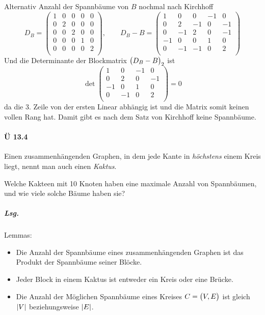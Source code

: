 \documentclass{scrreprt}
\begin{document}
\begin{enumerate}[(a)]
  \newpage
  Alternativ Anzahl der Spannbäume von $B$ nochmal nach Kirchhoff
  \[
    D_B = \begin{pmatrix}
      1 & 0 & 0 & 0 & 0 \\
      0 & 2 & 0 & 0 & 0 \\
      0 & 0 & 2 & 0 & 0 \\
      0 & 0 & 0 & 1 & 0 \\
      0 & 0 & 0 & 0 & 2 \\
    \end{pmatrix}, \qquad
    D_B - B = \begin{pmatrix}
      1  & 0  & 0  & -1 & 0  \\
      0  & 2  & -1 & 0  & -1 \\
      0  & -1 & 2  & 0  & -1 \\
      -1 & 0  & 0  & 1  & 0  \\
      0  & -1 & -1 & 0  & 2  \\
    \end{pmatrix}
  \]
  Und die Determinante der Blockmatrix $\qty\big(D_B - B)_2$ ist
  \[
    \det\begin{pmatrix}
      1  & 0  & -1 & 0  \\
      0  & 2  & 0  & -1 \\
      -1 & 0  & 1  & 0  \\
      0  & -1 & 0  & 2  \\
    \end{pmatrix} = 0
  \]
  da die 3. Zeile von der ersten Linear abhängig ist und die Matrix somit
  keinen vollen Rang hat.
  Damit gibt es nach dem Satz von Kirchhoff keine Spannbäume.

\end{enumerate}

\paragraph{Ü 13.4}

Einen zusammenhängenden Graphen, in dem jede Kante in \emph{höchstens} einem
Kreis liegt, nennt man auch einen \emph{Kaktus}.

Welche Kakteen mit 10 Knoten haben eine maximale Anzahl von Spannbäumen, und wie
viele solche Bäume haben sie?

\subparagraph{Lsg.} Lemmas:
\begin{itemize}
\item Die Anzahl der Spannbäume eines zusammenhängenden Graphen ist das Produkt
  der Spannbäume seiner Blöcke.
\item Jeder Block in einem Kaktus ist entweder ein Kreis oder eine Brücke.
\item Die Anzahl der Möglichen Spannbäume eines Kreises $C = \qty\big(V, E)$
  ist gleich $\abs{V}$ beziehungsweise $\abs{E}$.
\end{itemize}
\end{document}
